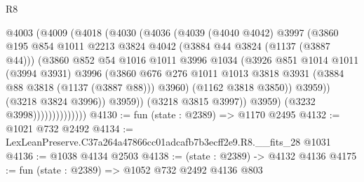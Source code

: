 \begin{lexlean}{R8}
\begin{coremodule}
                            @4003
                              (@4009
                                (@4018
                                  (@4030
                                    (@4036
                                      (@4039
                                        (@4040 @4042)
                                        @3997
                                        (@3860
                                          @195
                                          @854
                                          @1011
                                          @2213
                                          @3824
                                          @4042
                                          (@3884 @44 @3824 (@1137 (@3887 @44)))
                                          (@3860
                                            @852
                                            @54
                                            @1016
                                            @1011
                                            @3996
                                            @1034
                                            (@3926
                                              @851
                                              @1014
                                              @1011
                                              (@3994 @3931)
                                              @3996
                                              (@3860
                                                @676
                                                @276
                                                @1011
                                                @1013
                                                @3818
                                                @3931
                                                (@3884 @88 @3818 (@1137 (@3887 @88)))
                                                @3960)
                                              (@1162 @3818 @3850))
                                            @3959))
                                        (@3218 @3824 @3996))
                                      @3959))
                                  (@3218 @3815 @3997))
                                @3959)
                              (@3232 @3998))))))))))))))
@4130 := fun (state : @2389) => @1170 @2495
@4132 := @1021 @732 @2492
@4134 := LexLeanPreserve.C37a264a47866cc01adcafb7b3ecff2e9.R8.__fits_28 @1031
@4136 := @1038 @4134 @2503
@4138 := (state : @2389) -> @4132 @4136
@4175 := fun (state : @2389) =>
  @1052
    @732
    @2492
    @4136
    @803

\end{coremodule}
\end{lexlean}
